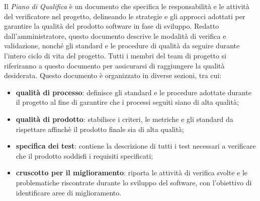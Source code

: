 Il \textit{Piano di Qualifica} è un documento che specifica le responsabilità e le attività del verificatore nel progetto, delineando le strategie e gli approcci adottati per garantire la qualità del prodotto software in fase di sviluppo. Redatto dall’amministratore, questo documento descrive le modalità di verifica e validazione, nonché gli standard e le procedure di qualità da seguire durante l'intero ciclo di vita del progetto. Tutti i membri del team di progetto si riferiranno a questo documento per assicurarsi di raggiungere la qualità desiderata. Questo documento è organizzato in diverse sezioni, tra cui:
\begin{itemize}
	\item \textbf{qualità di processo}: definisce gli standard e le procedure adottate durante il progetto al fine di garantire che i processi seguiti siano di alta qualità;
	\item \textbf{qualità di prodotto}: stabilisce i criteri, le metriche e gli standard da rispettare affinchè il prodotto finale sia di alta qualità;
	\item \textbf{specifica dei test}: contiene la descrizione di tutti i test necessari a verificare che il prodotto soddisfi i requisiti specificati;
	\item \textbf{cruscotto per il miglioramento}: riporta le attività di verifica svolte e le problematiche riscontrate durante lo sviluppo del software, con l'obiettivo di identificare aree di miglioramento.
\end{itemize}



